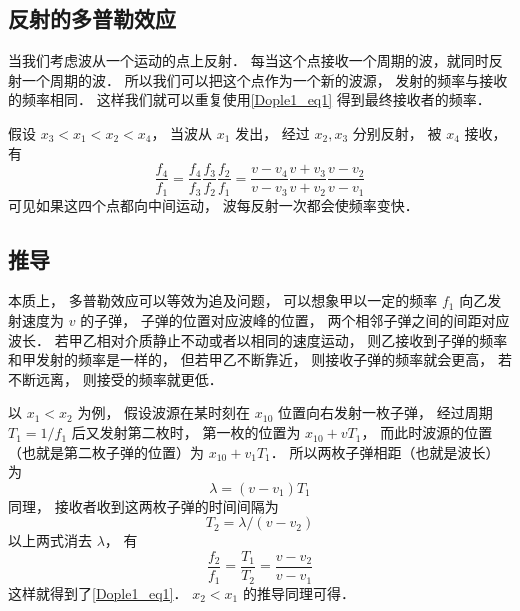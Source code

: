 \subsection{反射的多普勒效应}
当我们考虑波从一个运动的点上反射． 每当这个点接收一个周期的波，就同时反射一个周期的波． 所以我们可以把这个点作为一个新的波源， 发射的频率与接收的频率相同． 这样我们就可以重复使用\autoref{Dople1_eq1} 得到最终接收者的频率．

\begin{example}{}
假设 $x_3 < x_1 < x_2 < x_4$， 当波从 $x_1$ 发出， 经过 $x_2, x_3$ 分别反射， 被 $x_4$ 接收， 有
\begin{equation}
\frac{f_4}{f_1} = \frac{f_4}{f_3}\frac{f_3}{f_2}\frac{f_2}{f_1}
= \frac{v - v_4}{v - v_3}\frac{v + v_3}{v + v_2}\frac{v - v_2}{v - v_1}
\end{equation}
可见如果这四个点都向中间运动， 波每反射一次都会使频率变快．
\end{example}

\subsection{推导}
本质上， 多普勒效应可以等效为追及问题， 可以想象甲以一定的频率 $f_1$ 向乙发射速度为 $v$ 的子弹， 子弹的位置对应波峰的位置， 两个相邻子弹之间的间距对应波长． 若甲乙相对介质静止不动或者以相同的速度运动， 则乙接收到子弹的频率和甲发射的频率是一样的， 但若甲乙不断靠近， 则接收子弹的频率就会更高， 若不断远离， 则接受的频率就更低．

以 $x_1 < x_2$ 为例， 假设波源在某时刻在 $x_{10}$ 位置向右发射一枚子弹， 经过周期 $T_1 = 1/f_1$ 后又发射第二枚时， 第一枚的位置为 $x_{10} + vT_1$， 而此时波源的位置（也就是第二枚子弹的位置）为 $x_{10} + v_1 T_1$． 所以两枚子弹相距（也就是波长）为
\begin{equation}
\lambda = (v - v_1)T_1
\end{equation}
同理， 接收者收到这两枚子弹的时间间隔为
\begin{equation}
T_2 = \lambda/ (v - v_2)
\end{equation}
以上两式消去 $\lambda$， 有
\begin{equation}
\frac{f_2}{f_1} = \frac{T_1}{T_2} = \frac{v - v_2}{v - v_1}
\end{equation}
这样就得到了\autoref{Dople1_eq1}． $x_2 < x_1$ 的推导同理可得．
